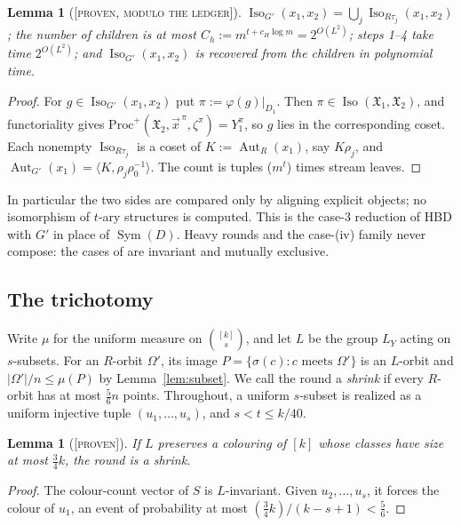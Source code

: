 \documentclass[11pt]{article}
\newtheorem{lemma}[theorem]{Lemma}
\theoremstyle{definition}
\theoremstyle{remark}
\newcommand{\Sym}{\operatorname{Sym}}
\newcommand{\Aut}{\operatorname{Aut}}
\newcommand{\Iso}{\operatorname{Iso}}
\newcommand{\fX}{\mathfrak X}
\newcommand{\Proven}{\textsc{[proven]}}
\newcommand{\ProvenM}{\textsc{[proven, modulo the ledger]}}
\begin{document}
\begin{lemma}[\ProvenM]\label{lem:pairwise}
$\Iso_{G'}(x_1,x_2)=\bigcup_j\Iso_{R\tau_j}(x_1,x_2)$; the number of children is at most $C_h:=m^{t+c_H\log m}=2^{O(L^2)}$; steps \textup{1--4} take time $2^{O(L^2)}$; and $\Iso_{G'}(x_1,x_2)$ is recovered from the children in polynomial time.
\end{lemma}
\begin{proof}
For $g\in\Iso_{G'}(x_1,x_2)$ put $\pi:=\varphi(g)|_{D_1}$. Then $\pi\in\Iso(\fX_1,\fX_2)$, and functoriality gives $\mathrm{Proc}^+(\fX_2,\vec x^{\,\pi},\zeta^\pi)=Y_1^\pi$, so $g$ lies in the corresponding coset. Each nonempty $\Iso_{R\tau_j}$ is a coset of $K:=\Aut_R(x_1)$, say $K\rho_j$, and $\Aut_{G'}(x_1)=\langle K,\rho_j\rho_0^{-1}\rangle$. The count is tuples ($m^t$) times stream leaves.
\end{proof}

In particular the two sides are compared only by aligning explicit objects; no isomorphism of $t$-ary structures is computed. This is the case-3 reduction of HBD with $G'$ in place of $\Sym(D)$. Heavy rounds and the case-(iv) family never compose: the cases of \cite[App.~A]{GNS} are invariant and mutually exclusive.

\subsection{The trichotomy}

Write $\mu$ for the uniform measure on $\binom{[k]}{s}$, and let $L$ be the group $L_Y$ acting on $s$-subsets. For an $R$-orbit $\Omega'$, its image $P=\{\sigma(c):c\text{ meets }\Omega'\}$ is an $L$-orbit and $|\Omega'|/n\le\mu(P)$ by Lemma~\ref{lem:subset}. We call the round a \emph{shrink} if every $R$-orbit has at most $\tfrac56n$ points. Throughout, a uniform $s$-subset is realized as a uniform injective tuple $(u_1,\dots,u_s)$, and $s<t\le k/40$.

\begin{lemma}[\Proven]\label{lem:colouring}
If $L$ preserves a colouring of $[k]$ whose classes have size at most $\tfrac34k$, the round is a shrink.
\end{lemma}
\begin{proof}
The colour-count vector of $S$ is $L$-invariant. Given $u_2,\dots,u_s$, it forces the colour of $u_1$, an event of probability at most $(\tfrac34k)/(k-s+1)<\tfrac56$.
\end{proof}
\end{document}
